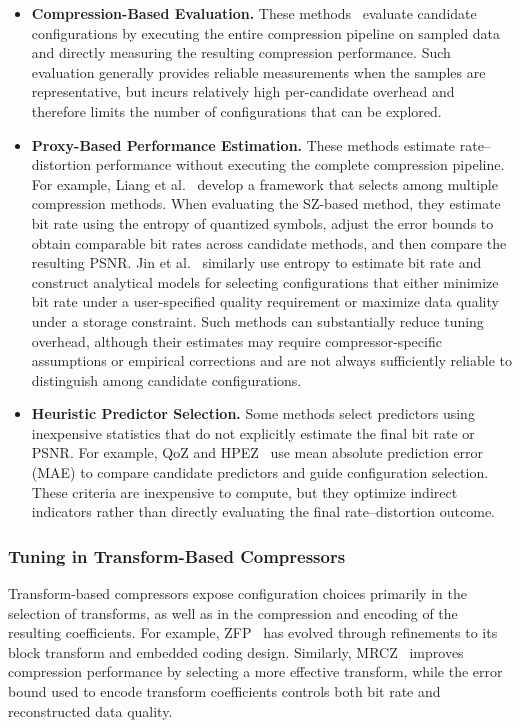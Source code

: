 \begin{itemize}
\item \textbf{Compression-Based Evaluation.} These methods~\cite{liang2022sz3,zhao2021optimizing,jian2024cliz} evaluate candidate configurations by executing the entire compression pipeline on sampled data and directly measuring the resulting compression performance. Such evaluation generally provides reliable measurements when the samples are representative, but incurs relatively high per-candidate overhead and therefore limits the number of configurations that can be explored.

\item \textbf{Proxy-Based Performance Estimation.} These methods estimate rate--distortion performance without executing the complete compression pipeline. For example, Liang et al.~\cite{liang2019significantly} develop a framework that selects among multiple compression methods. When evaluating the SZ-based method, they estimate bit rate using the entropy of quantized symbols, adjust the error bounds to obtain comparable bit rates across candidate methods, and then compare the resulting PSNR. Jin et al.~\cite{jin2022improving} similarly use entropy to estimate bit rate and construct analytical models for selecting configurations that either minimize bit rate under a user-specified quality requirement or maximize data quality under a storage constraint. Such methods can substantially reduce tuning overhead, although their estimates may require compressor-specific assumptions or empirical corrections and are not always sufficiently reliable to distinguish among candidate configurations.

\item \textbf{Heuristic Predictor Selection.} Some methods select predictors using inexpensive statistics that do not explicitly estimate the final bit rate or PSNR. For example, QoZ and HPEZ~\cite{liu2022dynamic,liu2024high} use mean absolute prediction error (MAE) to compare candidate predictors and guide configuration selection. These criteria are inexpensive to compute, but they optimize indirect indicators rather than directly evaluating the final rate--distortion outcome.
\end{itemize}

\subsubsection{Tuning in Transform-Based Compressors}\mbox{}

Transform-based compressors expose configuration choices primarily in the selection of transforms, as well as in the compression and encoding of the resulting coefficients. For example, ZFP~\cite{lindstrom2014fixed,diffenderfer2019error} has evolved through refinements to its block transform and embedded coding design. Similarly, MRCZ~\cite{jian2027mrcz} improves compression performance by selecting a more effective transform, while the error bound used to encode transform coefficients controls both bit rate and reconstructed data quality.

